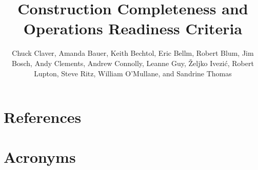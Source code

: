 \documentclass[SE,authoryear,toc]{lsstdoc}
\title{Construction Completeness and Operations Readiness Criteria}
\author{%
Chuck Claver, 
Amanda Bauer,
Keith Bechtol, 
Eric Bellm,
Robert Blum, 
Jim Bosch, 
Andy Clements,
Andrew Connolly, 
Leanne Guy,  
\v{Z}eljko Ivezi\'{c}, 
Robert Lupton,
Steve Ritz,
William O'Mullane, and
Sandrine Thomas
}
\date{\vcsDate}
\begin{document}
\maketitle














\pagebreak

\appendix
\section{References} \label{sec:bib}
\renewcommand{\refname}{} %


\pagebreak

\section{Acronyms} \label{sec:acronyms}

\end{document}
